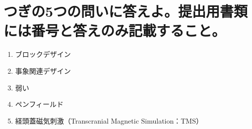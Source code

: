 \documentclass[titlepage,a4paper]{jsarticle}
\begin{document}
\section{つぎの5つの問いに答えよ。提出用書類には番号と答えのみ記載すること。}%
\begin{enumerate}
      \item ブロックデザイン
      \item 事象関連デザイン
      \item 弱い
      \item ペンフィールド
      \item 経頭蓋磁気刺激（Transcranial Magnetic Simulation：TMS）
\end{enumerate}
\end{document}
